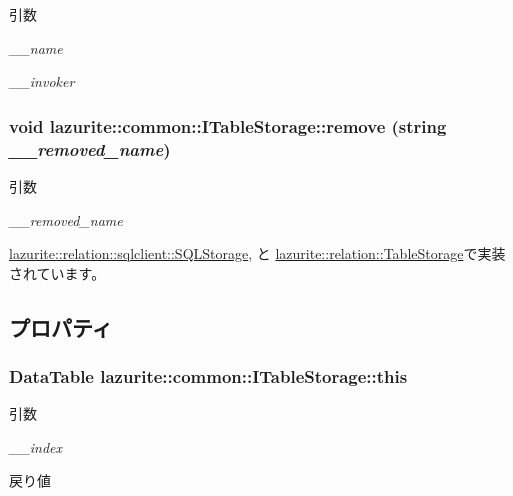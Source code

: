\begin{DoxyParams}{引数}
\item[{\em \_\-\_\-name}]\item[{\em \_\-\_\-invoker}]\end{DoxyParams}
\hypertarget{interfacelazurite_1_1common_1_1_i_table_storage_abb90f2c62e425951cebd5cd5067a005a}{
\subsubsection[{remove}]{\setlength{\rightskip}{0pt plus 5cm}void lazurite::common::ITableStorage::remove (string {\em \_\-\_\-removed\_\-name})}}
\label{interfacelazurite_1_1common_1_1_i_table_storage_abb90f2c62e425951cebd5cd5067a005a}

\begin{DoxyParams}{引数}
\item[{\em \_\-\_\-removed\_\-name}]\end{DoxyParams}


\hyperlink{classlazurite_1_1relation_1_1sqlclient_1_1_s_q_l_storage_a00e7725dfa5e9758202a22b6a8f816db}{lazurite::relation::sqlclient::SQLStorage}, と \hyperlink{classlazurite_1_1relation_1_1_table_storage_a68dfa6f296ed84619e4202458fdc22b9}{lazurite::relation::TableStorage}で実装されています。

\subsection{プロパティ}
\hypertarget{interfacelazurite_1_1common_1_1_i_table_storage_adba59c2b0bb2d632fbc2ae087b6b63f3}{
\subsubsection[{this}]{\setlength{\rightskip}{0pt plus 5cm}DataTable lazurite::common::ITableStorage::this}}
\label{interfacelazurite_1_1common_1_1_i_table_storage_adba59c2b0bb2d632fbc2ae087b6b63f3}

\begin{DoxyParams}{引数}
\item[{\em \_\-\_\-index}]\end{DoxyParams}
\begin{DoxyReturn}{戻り値}

\end{DoxyReturn}



